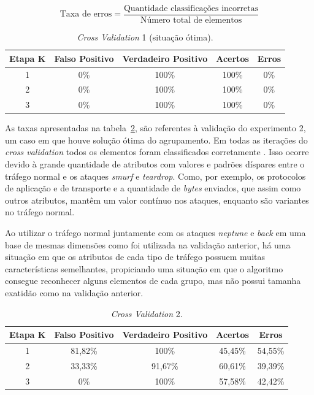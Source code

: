 \vspace{0.3cm}
\begin{equation}
\label{eq:Erros} %
\textrm{Taxa de erros} = \frac{\textrm{Quantidade classificações incorretas}}{\textrm{Número total de elementos}}
\end{equation}
\vspace{0cm}

\begin{table}[h]
\centering
\caption{\textit{Cross Validation} 1 (situação ótima).}
\vspace{0.5cm}
\begin{tabular}{|c|c|c|c|c|}
\hline
\textbf{Etapa K} & \textbf{Falso Positivo} & \textbf{Verdadeiro Positivo} & \textbf{Acertos} & \textbf{Erros}\\
\hline
1 & 0\% & 100\% & 100\% & 0\% \\
\hline
2 & 0\% & 100\% & 100\% & 0\%\\
\hline
3 & 0\% & 100\% & 100\%& 0\%\\
\hline
\end{tabular}
\label{tab5}
\end{table}

\indent As taxas apresentadas na tabela~\ref{tabela6}, são referentes à validação do experimento 2, um caso em que houve solução ótima do agrupamento. Em todas as iterações do \textit{cross validation} todos os elementos foram classificados corretamente . Isso ocorre devido à grande quantidade de atributos com valores e padrões díspares entre o tráfego normal e os ataques \textit{smurf} e \textit{teardrop}. Como, por exemplo, os protocolos de aplicação e de transporte e a quantidade de \textit{bytes} enviados, que assim como outros atributos, mantêm um valor contínuo nos ataques, enquanto são variantes no tráfego normal.

\indent Ao utilizar o tráfego normal juntamente com os ataques \textit{neptune} e \textit{back} em uma base de mesmas dimensões como foi utilizada na validação anterior, há uma situação em que os atributos de cada tipo de tráfego possuem muitas características semelhantes, propiciando uma situação em que o algoritmo consegue reconhecer alguns elementos de cada grupo, mas não possui tamanha exatidão como na validação anterior. 

\begin{table}[h]
\centering
\caption{\textit{Cross Validation} 2.}
\label{tabela6}
\vspace{0.5cm}
\begin{tabular}{|c|c|c|c|c|}
\hline
\textbf{Etapa K} & \textbf{Falso Positivo} & \textbf{Verdadeiro Positivo} & \textbf{Acertos} & \textbf{Erros}\\
\hline
1 & 81,82\% & 100\% & 45,45\% & 54,55\% \\
\hline
2 & 33,33\% & 91,67\% & 60,61\% & 39,39\%\\
\hline
3 & 0\% & 100\% & 57,58\% & 42,42\%\\
\hline
\end{tabular}
\end{table}

